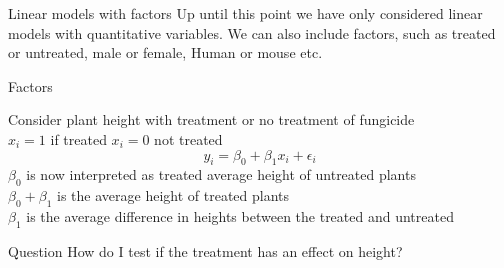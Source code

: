 \documentclass{bredelebeamer}
\begin{document}
\begin{frame}{Linear models with factors}
Up until this point we have only considered linear models with quantitative variables. We can also include factors, such as treated or untreated, male or female, Human or mouse etc.
\begin{exampleblock}{Factors}

Consider plant height with treatment or no treatment of fungicide 
\\
 $x_i = 1$ if treated $x_i = 0$ not treated
\begin{equation}
y_i = \beta_0 + \beta_1x_i + \epsilon_i
\end{equation}
 $\beta_0$ is now interpreted as treated average height of untreated plants
 \\
 $\beta_0 + \beta_1$ is the average height of treated plants
 \\
 $\beta_1$ is the average difference in heights between the treated and untreated

\end{exampleblock}

\begin{alertblock}{Question}
How do I test if the treatment has an effect on height?
\end{alertblock}

\end{frame}
\end{document}

